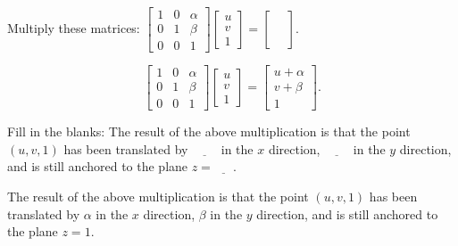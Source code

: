 \documentclass[../key.tex]{subfiles}
\begin{document}
\begin{inner_problem}[start=1]
\item Multiply these matrices: $\left[\begin{array}{ccc} 1 & 0 & \alpha \\ 0 & 1 & \beta \\ 0 & 0 & 1 \end{array}\right]\left[\begin{array}{c}u \\ v \\ 1 \end{array}\right]=\left[\begin{array}{c}\phantom{u} \\ \phantom{v} \\ \phantom{1}\end{array}\right].$ \label{prob:translation_matrix}
\end{inner_problem}

$$\begin{bmatrix} 1 & 0 & \alpha \\ 0 & 1 & \beta \\ 0 & 0 & 1 \end{bmatrix} \begin{bmatrix}u \\ v \\ 1 \end{bmatrix} = \begin{bmatrix} u + \alpha \\ v + \beta \\ 1 \end{bmatrix}.$$

\begin{inner_problem}
\item Fill in the blanks: The result of the above multiplication is that the point $(u,v,1)$ has been translated by $\underline{\phantom{0000}}$ in the $x$ direction, $\underline{\phantom{0000}}$ in the $y$ direction, and is still anchored to the plane $z=\underline{\phantom{000}}$.
\end{inner_problem}

The result of the above multiplication is that the point $(u,v,1)$ has been translated by \underline{$\alpha$} in the $x$ direction, \underline{$\beta$} in the $y$ direction, and is still anchored to the plane $z=$\underline{$1$}.

\begin{outer_problem}
\item
\end{outer_problem}
\end{document}
